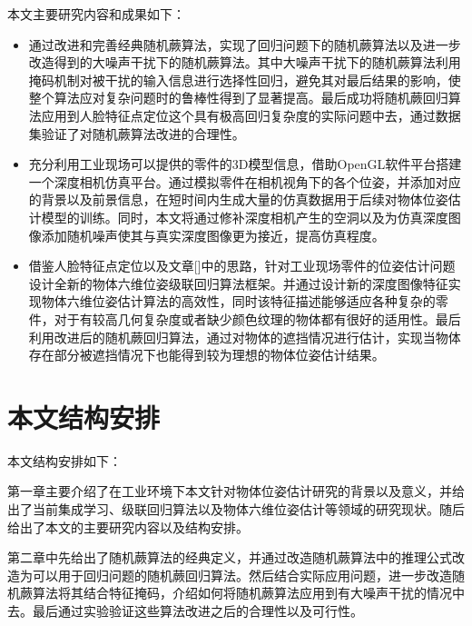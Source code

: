 本文主要研究内容和成果如下：
\begin{itemize}
\item 通过改进和完善经典随机蕨算法，实现了回归问题下的随机蕨算法以及进一步改造得到的大噪声干扰下的随机蕨算法。其中大噪声干扰下的随机蕨算法利用掩码机制对被干扰的输入信息进行选择性回归，避免其对最后结果的影响，使整个算法应对复杂问题时的鲁棒性得到了显著提高。最后成功将随机蕨回归算法应用到人脸特征点定位这个具有极高回归复杂度的实际问题中去，通过数据集验证了对随机蕨算法改进的合理性。
\item 充分利用工业现场可以提供的零件的3D模型信息，借助OpenGL软件平台搭建一个深度相机仿真平台。通过模拟零件在相机视角下的各个位姿，并添加对应的背景以及前景信息，在短时间内生成大量的仿真数据用于后续对物体位姿估计模型的训练。同时，本文将通过修补深度相机产生的空洞以及为仿真深度图像添加随机噪声使其与真实深度图像更为接近，提高仿真程度。

\item 借鉴人脸特征点定位以及文章[]中的思路，针对工业现场零件的位姿估计问题设计全新的物体六维位姿级联回归算法框架。并通过设计新的深度图像特征实现物体六维位姿估计算法的高效性，同时该特征描述能够适应各种复杂的零件，对于有较高几何复杂度或者缺少颜色纹理的物体都有很好的适用性。最后利用改进后的随机蕨回归算法，通过对物体的遮挡情况进行估计，实现当物体存在部分被遮挡情况下也能得到较为理想的物体位姿估计结果。
\end{itemize}


\section{本文结构安排}

本文结构安排如下：

第一章主要介绍了在工业环境下本文针对物体位姿估计研究的背景以及意义，并给出了当前集成学习、级联回归算法以及物体六维位姿估计等领域的研究现状。随后给出了本文的主要研究内容以及结构安排。

第二章中先给出了随机蕨算法的经典定义，并通过改造随机蕨算法中的推理公式改造为可以用于回归问题的随机蕨回归算法。然后结合实际应用问题，进一步改造随机蕨算法将其结合特征掩码，介绍如何将随机蕨算法应用到有大噪声干扰的情况中去。最后通过实验验证这些算法改进之后的合理性以及可行性。


